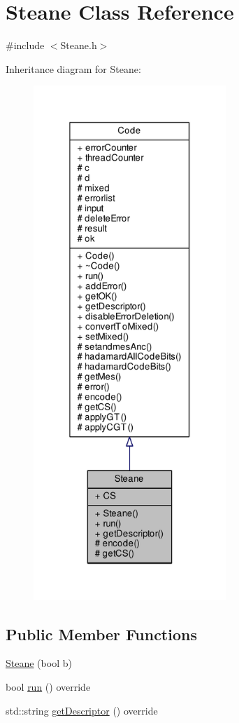 \hypertarget{class_steane}{}\section{Steane Class Reference}
\label{class_steane}


{\ttfamily \#include $<$Steane.\+h$>$}



Inheritance diagram for Steane\+:\nopagebreak
\begin{figure}[H]
\begin{center}
\leavevmode
\includegraphics[height=550pt]{class_steane__inherit__graph}
\end{center}
\end{figure}
\subsection*{Public Member Functions}
\begin{DoxyCompactItemize}
\item 
\hyperlink{class_steane_a7cda04d9619fc019d03e16f137851762}{Steane} (bool b)
\item 
bool \hyperlink{class_steane_a0d891a1213b62e1b225fab265fab3fc9}{run} () override
\item 
std\+::string \hyperlink{class_steane_a1fb53da78a66d64cd6aad02735fab4c3}{get\+Descriptor} () override
\end{DoxyCompactItemize}
